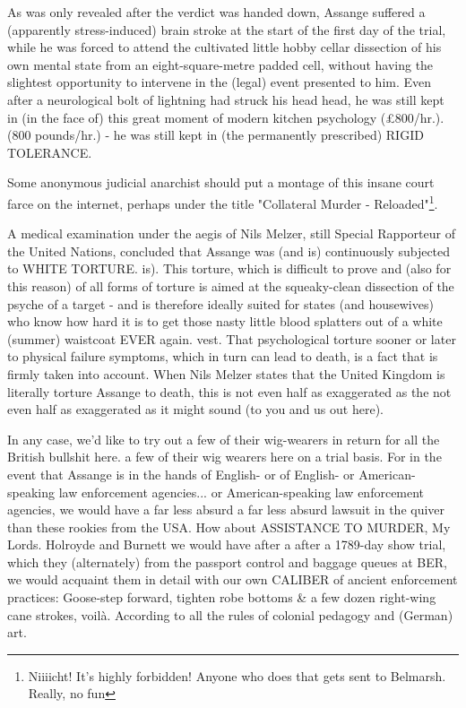 \begin{multicols}{2}
As was only revealed after the verdict was handed down, Assange
suffered a (apparently stress-induced) brain stroke at the start of the first day of the trial,
while he was forced to attend the cultivated little hobby cellar dissection of his own mental
state from an eight-square-metre padded cell, without having the slightest opportunity to
intervene in the (legal) event presented to him. Even after a neurological bolt of lightning had
struck his head head, he was still kept in (in the face of) this great moment of modern kitchen
psychology (£800/hr.).(800 pounds/hr.) - he was still kept in (the permanently prescribed) RIGID
TOLERANCE.

Some anonymous judicial anarchist should put a montage of this insane court farce on the internet,
perhaps under the title
"Collateral Murder - Reloaded"\footnote[35]{Niiiicht! It's highly forbidden! Anyone who does that
 gets sent to Belmarsh. Really, no fun}.

A medical examination under the aegis of Nils Melzer, still Special Rapporteur of the United
Nations, concluded that Assange was (and is) continuously subjected to WHITE TORTURE. is). This
torture, which is difficult to prove and (also for this reason) of all forms of torture is aimed at
the squeaky-clean dissection of the psyche of a target - and is therefore ideally suited for
states (and housewives) who know how hard it is to get those nasty little blood splatters out of a
white (summer) waistcoat EVER again. vest. That psychological torture sooner or later to physical
failure symptoms, which in turn can lead to death, is a fact that is firmly taken into account.
When Nils Melzer states that the United Kingdom is literally torture Assange to death, this is not
even half as exaggerated as the not even half as exaggerated as it might sound (to you and us out
here).

In any case, we'd like to try out a few of their wig-wearers in return for all the British bullshit
here. a few of their wig wearers here on a trial basis. For in the event that Assange is in the
hands of English- or of English- or American-speaking law enforcement agencies... or
American-speaking law enforcement agencies, we would have a far less absurd a far less absurd
lawsuit in the quiver than these rookies from the USA. How about ASSISTANCE TO MURDER, My Lords.
Holroyde and Burnett we would have after a after a 1789-day show trial, which they
(alternately) from the passport control and baggage queues at BER, we would acquaint them in detail
with our own CALIBER of ancient enforcement practices: Goose-step forward, tighten robe bottoms
\& a few dozen right-wing cane strokes, voilà. According to all the rules of colonial pedagogy and
   (German) art.


\end{multicols}
